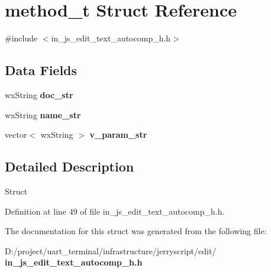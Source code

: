 \section{method\+\_\+t Struct Reference}
\label{structmethod__t}


{\ttfamily \#include $<$in\+\_\+js\+\_\+edit\+\_\+text\+\_\+autocomp\+\_\+h.\+h$>$}

\subsection*{Data Fields}
\begin{DoxyCompactItemize}
\item 
\mbox{\label{structmethod__t_a5022458fa3153c90582a7211ecb43f3a}} 
wx\+String {\bfseries doc\+\_\+str}
\item 
\mbox{\label{structmethod__t_a4f420117d8c68001f3c555687fee0d84}} 
wx\+String {\bfseries name\+\_\+str}
\item 
\mbox{\label{structmethod__t_a74429d296c8273b736686307bb4cc9b9}} 
vector$<$ wx\+String $>$ {\bfseries v\+\_\+param\+\_\+str}
\end{DoxyCompactItemize}


\subsection{Detailed Description}
Struct 

Definition at line 49 of file in\+\_\+js\+\_\+edit\+\_\+text\+\_\+autocomp\+\_\+h.\+h.



The documentation for this struct was generated from the following file\+:\begin{DoxyCompactItemize}
\item 
D\+:/project/uart\+\_\+terminal/infrastructure/jerryscript/edit/\textbf{ in\+\_\+js\+\_\+edit\+\_\+text\+\_\+autocomp\+\_\+h.\+h}\end{DoxyCompactItemize}

